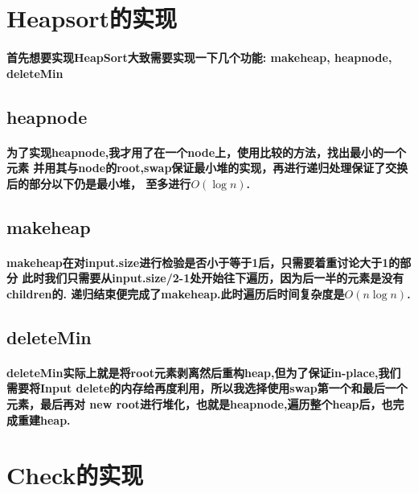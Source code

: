 \documentclass[UTF8]{ctexart}
\begin{document}
\pagestyle{fancy}
\fancyhead{}
\setlength{\headheight}{12.64723pt}

\section{Heapsort的实现}

\paragraph{
首先想要实现HeapSort大致需要实现一下几个功能: 
makeheap,
heapnode,
deleteMin}
\subsection{heapnode}
\paragraph{\hspace{2em}为了实现heapnode,我才用了在一个node上，使用比较的方法，找出最小的一个元素
并用其与node的root,swap保证最小堆的实现，再进行递归处理保证了交换后的部分以下仍是最小堆，
至多进行$O(\log n)$.}
\subsection{makeheap}
\paragraph{\hspace{2em}makeheap在对input.size进行检验是否小于等于1后，只需要着重讨论大于1的部分
此时我们只需要从input.size/2-1处开始往下遍历，因为后一半的元素是没有children的.
递归结束便完成了makeheap.此时遍历后时间复杂度是$O(n\log n)$.}
\subsection{deleteMin}
\paragraph{\hspace{2em}deleteMin实际上就是将root元素剥离然后重构heap,但为了保证in-place,我们
需要将Input delete的内存给再度利用，所以我选择使用swap第一个和最后一个元素，最后再对
new root进行堆化，也就是heapnode,遍历整个heap后，也完成重建heap.}

\section{Check的实现}
\end{document}
